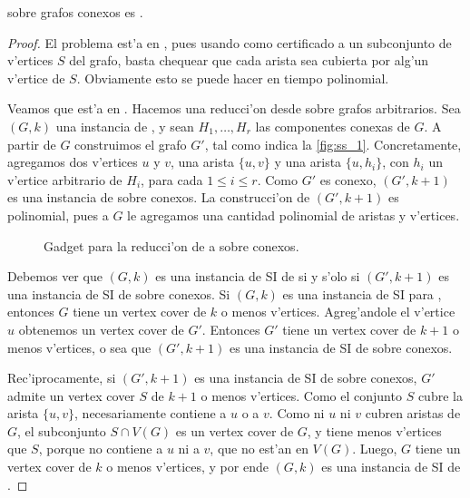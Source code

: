 \begin{proposition}
 sobre grafos conexos es .

\begin{proof}
El problema est'a en , pues usando como certificado a un subconjunto de v'ertices $S$ del grafo, basta chequear que cada arista sea cubierta por alg'un v'ertice de $S$. Obviamente esto se puede hacer en tiempo polinomial.

Veamos que est'a en . Hacemos una reducci'on desde  sobre grafos arbitrarios. Sea $(G, k)$ una instancia de , y sean $H_1, \dots, H_r$ las componentes conexas de $G$. A partir de $G$ construimos el grafo $G'$, tal como indica la \autoref{fig:ss_1}. Concretamente, agregamos dos v'ertices $u$ y $v$, una arista $\{u, v\}$ y una arista $\{u, h_i\}$, con $h_i$ un v'ertice arbitrario de $H_i$, para cada $1 \leq i \leq r$. Como $G'$ es conexo, $(G', k + 1)$ es una instancia de  sobre conexos. La construcci'on de $(G', k + 1)$ es polinomial, pues a $G$ le agregamos una cantidad polinomial de aristas y v'ertices.

\begin{figure}[h]
	\begin{center}
		
	\end{center}		
	\caption{Gadget para la reducci'on de  a  sobre conexos.}
	\label{fig:ss_1}
\end{figure}

Debemos ver que $(G, k)$ es una instancia de SI de  si y s'olo si $(G', k + 1)$ es una instancia de SI de  sobre conexos. Si $(G, k)$ es una instancia de SI para , entonces $G$ tiene un vertex cover de $k$ o menos v'ertices. Agreg'andole el v'ertice $u$ obtenemos un vertex cover de $G'$. Entonces $G'$ tiene un vertex cover de $k + 1$ o menos v'ertices, o sea que $(G', k + 1)$ es una instancia de SI de  sobre conexos.

Rec'iprocamente, si $(G', k + 1)$ es una instancia de SI de  sobre conexos, $G'$ admite un vertex cover $S$ de $k + 1$ o menos v'ertices. Como el conjunto $S$ cubre la arista $\{u, v\}$, necesariamente contiene a $u$ o a $v$. Como ni $u$ ni $v$ cubren aristas de $G$, el subconjunto $S \cap V(G)$ es un vertex cover de $G$, y tiene menos v'ertices que $S$, porque no contiene a $u$ ni a $v$, que no est'an en $V(G)$. Luego, $G$ tiene un vertex cover de $k$ o menos v'ertices, y por ende $(G, k)$ es una instancia de SI de .
\end{proof}
\end{proposition}

